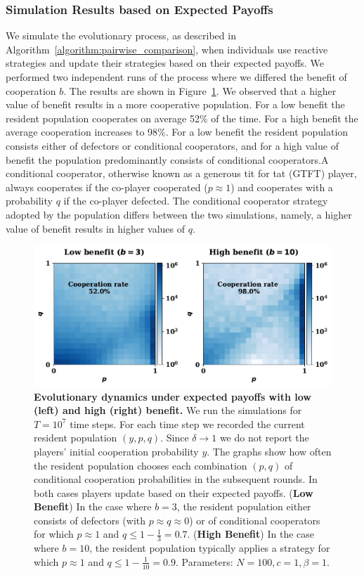 \documentclass[11pt]{article}
\theoremstyle{plainCl1}
\theoremstyle{plainCl2}
\begin{document}
\subsubsection*{Simulation Results based on Expected Payoffs}

We simulate the evolutionary process, as described in
Algorithm~\ref{algorithm:pairwise_comparison}, when individuals use reactive
strategies and update their strategies based on their expected payoffs. We
performed two independent runs of the process where we differed the benefit of
cooperation \(b\). The results are shown in
Figure~\ref{fig:expected_payoffs_results}. We observed that a higher value of
benefit results in a more cooperative population. For a low benefit the resident
population cooperates on average 52\% of the time. For a high benefit the
average cooperation increases to 98\%. For a low benefit the resident population
consists either of defectors or conditional cooperators, and for a high value of
benefit the population predominantly consists of conditional cooperators.A
conditional cooperator, otherwise known as a generous tit for tat (GTFT)
player, always cooperates if the co-player cooperated ($p\approx1$) and
cooperates with a probability \(q\) if the co-player defected. The conditional
cooperator strategy adopted by the population differs between the two
simulations, namely, a higher value of benefit results in higher values
of \(q\).

\begin{figure}[!htbp]
    \centering 
    \includegraphics[width=.70\textwidth]{static/expected_payoffs_donation_game.pdf}
    \caption{\textbf{Evolutionary dynamics under expected payoffs with
    low (left) and high (right) benefit.} We run the simulations for \(T =
    10^7\) time steps. For each time step we recorded the current resident
    population \((y, p, q)\). Since \(\delta \rightarrow
    1\) we do not report the players' initial cooperation probability \(y\).
    The graphs show how often the resident population chooses each combination
    \((p, q)\) of conditional cooperation probabilities in the subsequent
    rounds. In both cases players update based on their expected payoffs.
    ({\bf Low Benefit}) In
    the case where \(b=3\), the resident population either consists of defectors
    (with \(p \approx q \approx 0\)) or of conditional cooperators for which \(p
    \approx 1\) and \(q \leq 1 - \frac{1}{3}=0.7\). ({\bf High Benefit}) In the case where
    \(b=10\), the resident population typically applies a strategy for which \(p
    \approx 1\) and \(q \leq 1 - \frac{1}{10}=0.9\). Parameters: \(N =100, c=1,
    \beta=1\).
    }\label{fig:expected_payoffs_results}
\end{figure}
\end{document}
